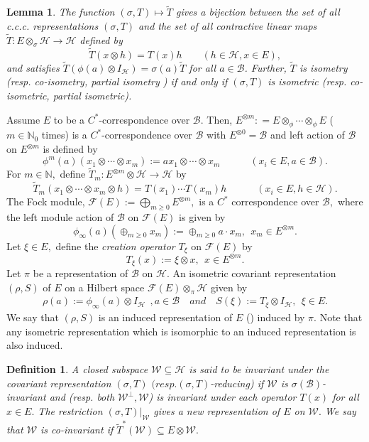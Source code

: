 \documentclass[12pt]{amsart}
\numberwithin{equation}{section}
\theoremstyle{plain}
\newtheorem{lemma}[theorem]{Lemma}
\newtheorem{definition}[theorem]{Definition}
\newcommand{\ot}{\otimes}
\newcommand{\wt}{\widetilde}
\newcommand{\wT}{\wt{T}}
\begin{document}
	\begin{lemma} \label{MSC}
		The function $(\sigma, T)\mapsto \widetilde{T}$ gives a bijection between the set of all c.c.c. representations $(\sigma, T)$
		and the set of all contractive linear maps $\widetilde{T}:E\otimes_{\sigma} \mathcal H\to \mathcal
		H$ defined by
		\[
		\widetilde{T}(x\otimes h)=T(x)h \quad \quad (
		h\in\mathcal H,x\in E),
		\] and satisfies $\widetilde{T}(\phi(a)\otimes I_{\mathcal
			H})=\sigma(a)\widetilde{T}$ for all $a\in\mathcal{B}$. Further, $\wT$ is {\rm isometry} (resp. {\rm co-isometry, partial isometry }) if and only if $(\sigma, T)$ is isometric (resp. {\rm co-isometric, partial isometric}).
	\end{lemma}
	Assume $E$ to be a $C^*$-correspondence over $\mathcal{B}.$ Then,
	$E^{\otimes m}: =E\otimes_{\phi} \cdots \otimes_{\phi}E$ ($m\in\mathbb{N}_0$ times) is a $C^*$-correspondence over $\mathcal{B}$ with $E^{\ot 0}=\mathcal{B}$ and left action of $\mathcal{B}$ on $E^{\otimes m}$  is defined by  $$\phi^m(a)(x_1 \otimes \cdots \otimes x_m):=ax_1\otimes \cdots \otimes x_m \quad \quad \quad (x_i \in E, a\in\mathcal{B}).$$ 
	For  $m\in \mathbb{N},$ define $\wT_m : E^{\ot m}\ot \mathcal{H} \to \mathcal{H}$ by 
	$$\wT_m (x_1 \ot \cdots \ot x_m \ot h) = T (x_1) \cdots T(x_m) h \quad \quad \quad (x_i \in E, h \in \mathcal H).$$
	The Fock module, $\mathcal{F}(E):= \bigoplus_{m \geq 0}E^{\otimes m},$ is a $C^*$ correspondence over $\mathcal{B},$ where the left module action of $\mathcal{B}$ on $\mathcal{F}(E)$ is given by $$\phi_{\infty}(a)(\oplus_{m \geq 0}x_m):=\oplus_{m \geq 0}a\cdot x_m , \:\: x_m \in E^{\otimes m}.$$
	Let $\xi \in E,$ define the {\it creation operator} $T_{\xi}$ on $\mathcal{F}(E)$  by $$T_{\xi}(x):=\xi \otimes x, \:\: x \in E^{\otimes m}.$$
	Let $\pi$ be a representation of $\mathcal{B}$ on $\mathcal{H}$. An isometric covariant representation $(\rho, S)$ of $E$ on a Hilbert space $\mathcal{F}(E)\otimes_{\pi}\mathcal{H}$ given by
	\begin{align*}
	\rho(a):=\phi_{\infty}(a) \otimes I_{\mathcal{H}} \:\:, a \in \mathcal{B} \quad and \quad
	S(\xi):=T_{\xi}\otimes I_{\mathcal{H}} ,\:\: \xi \in E.
	\end{align*}
	We say that $(\rho,S)$ is an induced representation of $E$ (\cite{mR74}) induced  by $\pi$. Note that any isometric representation which is isomorphic to an induced representation is also induced.
	
	\begin{definition}	
 A closed subspace $\mathcal{W}\subseteq\mathcal{H}$ is said to be {\rm invariant} under the covariant representation $(\sigma, T)$ $(resp. (\sigma,T)$-{\rm reducing}) if $\mathcal{W}$ is  $\sigma{(\mathcal{B})}$-invariant and (resp. both $\mathcal{W}^{\perp}, \mathcal{W}$) is invariant under each operator  $T(x)$ for all $x \in E.$ The restriction $(\sigma , T)|_{\mathcal{W}}$ gives a new representation of $E$ on $\mathcal{W}.$ We say that $\mathcal{W}$ is {\rm co-invariant} if $\wT^*{(\mathcal{W})}\subseteq E\ot \mathcal{W}.$
	\end{definition}
	
\end{document}
